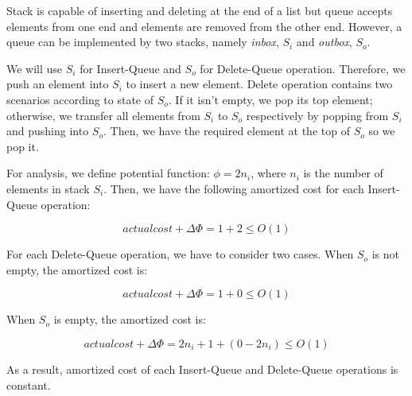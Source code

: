 Stack is capable of inserting and deleting at the end of a list but queue accepts elements from one end and elements are removed from the other end. However, a queue can be implemented by two stacks, namely \textit{inbox}, $S_{i}$ and \textit{outbox}, $S_{o}$.

We will use $S_{i}$ for Insert-Queue and $S_{o}$ for Delete-Queue operation. Therefore, we push an element into $S_{i}$ to insert a new element. Delete operation contains two scenarios according to state of $S_{o}$. If it isn't empty, we pop its top element; otherwise, we transfer all elements from $S_{i}$ to $S_{o}$ respectively by popping from $S_{i}$ and pushing into $S_{o}$. Then, we have the required element at the top of $S_{o}$ so we pop it.

For analysis, we define potential function: $\phi = 2n_{i}$, where $n_{i}$ is the number of elements in stack $S_{i}$. Then, we have the following amortized cost for each Insert-Queue operation:

$$
	actual cost + \Delta\Phi = 1 + 2 \leq O(1)
$$

For each Delete-Queue operation, we have to consider two cases. When $S_{o}$ is not empty, the amortized cost is:

$$
	actual cost + \Delta\Phi = 1 + 0 \leq O(1)
$$

When $S_{o}$ is empty, the amortized cost is:

$$
	actual cost + \Delta\Phi = 2n_{i} + 1 + (0 - 2n_{i}) \leq O(1)
$$

As a result, amortized cost of each Insert-Queue and Delete-Queue operations is constant.